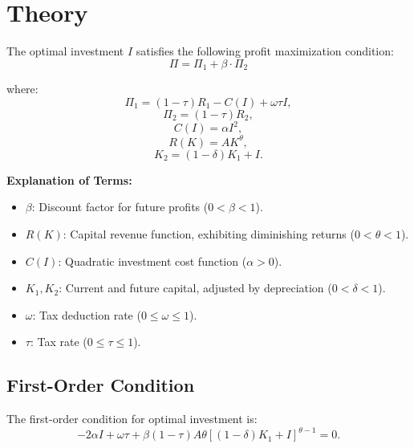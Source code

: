 \documentclass[11pt]{article}
\begin{document}
\section{Theory}

The optimal investment \( I \) satisfies the following profit maximization condition:
\begin{equation}
\Pi = \Pi_1 + \beta \cdot \Pi_2
\end{equation}

\noindent where:
\begin{equation}
\Pi_1 = (1 - \tau) R_1 - C(I) + \omega \tau I,
\end{equation}
\begin{equation}
\Pi_2 = (1 - \tau) R_2,
\end{equation}
\begin{equation}
C(I) = \alpha I^2,
\end{equation}
\begin{equation}
R(K) = A K^\theta,
\end{equation}
\begin{equation}
K_2 = (1 - \delta) K_1 + I.
\end{equation}

\noindent \textbf{Explanation of Terms:}
\begin{itemize}
    \item \( \beta \): Discount factor for future profits (\( 0 < \beta < 1 \)).
    \item \( R(K) \): Capital revenue function, exhibiting diminishing returns (\( 0 < \theta < 1 \)).
    \item \( C(I) \): Quadratic investment cost function (\( \alpha > 0 \)).
    \item \( K_1, K_2 \): Current and future capital, adjusted by depreciation (\( 0 < \delta < 1 \)).
    \item \( \omega \): Tax deduction rate (\( 0 \leq \omega \leq 1 \)).
    \item \( \tau \): Tax rate (\( 0 \leq \tau \leq 1 \)).
\end{itemize}

\subsection{First-Order Condition}

The first-order condition for optimal investment is:
\begin{equation}
-2\alpha I + \omega \tau + \beta (1 - \tau) A \theta \left[(1 - \delta) K_1 + I\right]^{\theta - 1} = 0.
\end{equation}
\end{document}
